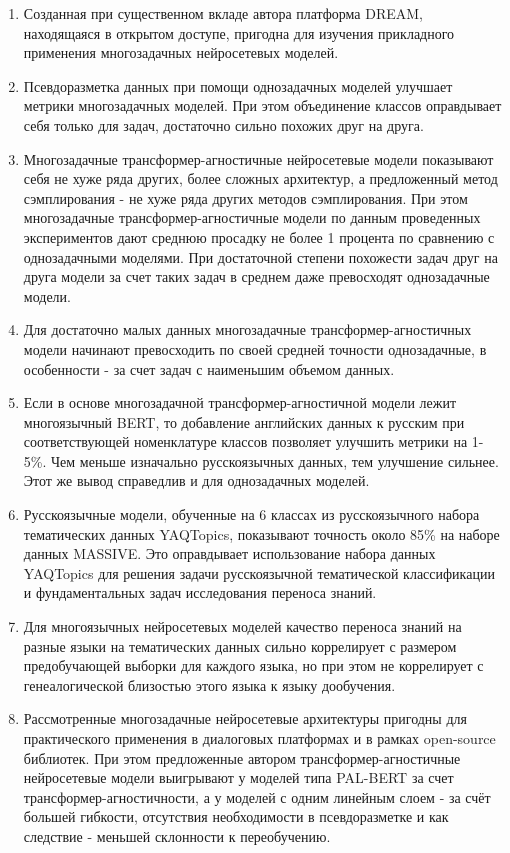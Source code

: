 {}
\begin{enumerate}
  \item {Созданная при существенном вкладе автора платформа DREAM, находящаяся в открытом доступе, пригодна для изучения прикладного применения многозадачных нейросетевых моделей.}
  \item {Псевдоразметка данных при помощи однозадачных моделей улучшает метрики многозадачных моделей. При этом объединение классов оправдывает себя только для задач, достаточно сильно похожих друг на друга.}
  \item {Многозадачные трансформер-агностичные нейросетевые модели показывают себя не хуже ряда других, более сложных архитектур, а предложенный метод сэмплирования - не хуже ряда других методов сэмплирования. При этом многозадачные трансформер-агностичные модели по данным проведенных экспериментов дают среднюю просадку не более 1 процента по сравнению с однозадачными моделями. При достаточной степени похожести задач друг на друга модели за счет таких задач в среднем даже превосходят однозадачные модели.}
  \item {Для достаточно малых данных многозадачные трансформер-агностичных модели начинают превосходить по своей средней точности однозадачные, в особенности - за счет задач с наименьшим объемом данных.}
  \item {Если в основе многозадачной трансформер-агностичной модели лежит многоязычный BERT, то добавление английских данных к русским при соответствующей номенклатуре классов позволяет улучшить метрики на 1-5\%. Чем меньше изначально русскоязычных данных, тем улучшение сильнее. Этот же вывод справедлив и для однозадачных моделей.}
  \item {Русскоязычные модели, обученные на 6 классах из русскоязычного набора тематических данных YAQTopics, показывают точность около 85\% на наборе данных MASSIVE. Это оправдывает использование набора данных YAQTopics для решения задачи русскоязычной тематической классификации и фундаментальных задач исследования переноса знаний.}
  \item {Для многоязычных нейросетевых моделей качество переноса знаний на разные языки на тематических данных сильно коррелирует с размером предобучающей выборки для каждого языка, но при этом не коррелирует с генеалогической близостью этого языка к языку дообучения.}
  \item {Рассмотренные многозадачные нейросетевые архитектуры пригодны для практического применения в диалоговых платформах и в рамках open-source библиотек. При этом предложенные автором трансформер-агностичные нейросетевые модели выигрывают у моделей типа PAL-BERT за счет трансформер-агностичности, а у моделей с одним линейным слоем - за счёт большей гибкости, отсутствия необходимости в псевдоразметке и как следствие - меньшей склонности к переобучению.}
\end{enumerate}


